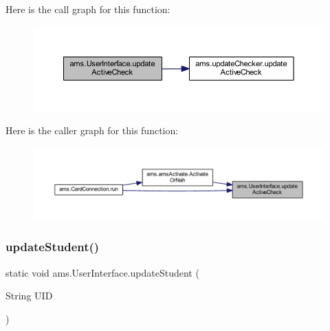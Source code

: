 Here is the call graph for this function\+:\nopagebreak
\begin{figure}[H]
\begin{center}
\leavevmode
\includegraphics[width=350pt]{classams_1_1_user_interface_a9350019300425cd33e6afa3155029ce6_cgraph}
\end{center}
\end{figure}
Here is the caller graph for this function\+:\nopagebreak
\begin{figure}[H]
\begin{center}
\leavevmode
\includegraphics[width=350pt]{classams_1_1_user_interface_a9350019300425cd33e6afa3155029ce6_icgraph}
\end{center}
\end{figure}
\mbox{\label{classams_1_1_user_interface_a2c095e5b4874956fc7831b9986656130}} 
\subsubsection{\texorpdfstring{updateStudent()}{updateStudent()}}
{\footnotesize\ttfamily static void ams.\+User\+Interface.\+update\+Student (\begin{DoxyParamCaption}\item[{String}]{U\+ID }\end{DoxyParamCaption})\hspace{0.3cm}{\ttfamily [static]}}

